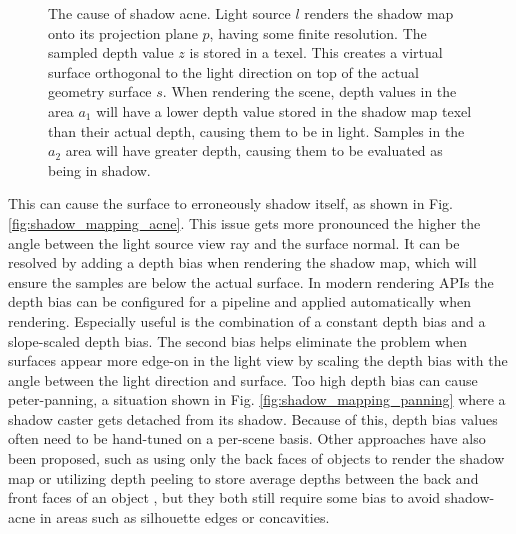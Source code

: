 \begin{figure}[hp]
    \caption{The cause of shadow acne. Light source \(l\) renders the shadow map onto its projection plane \(p\), having some finite resolution. The sampled depth value \(z\) is stored in a texel. This creates a virtual surface orthogonal to the light direction on top of the actual geometry surface \(s\). When rendering the scene, depth values in the area \(a_1\) will have a lower depth value stored in the shadow map texel than their actual depth, causing them to be in light. Samples in the \(a_2\) area will have greater depth, causing them to be evaluated as being in shadow.}
    \label{fig:shadow_mapping_acne_explanation}
\end{figure}
This can cause the surface to erroneously shadow itself, as shown in Fig. \ref{fig:shadow_mapping_acne}. This issue gets more pronounced the higher the angle between the light source view ray and the surface normal. It can be resolved by adding a depth bias when rendering the shadow map, which will ensure the samples are below the actual surface. In modern rendering APIs the depth bias can be configured for a pipeline and applied automatically when rendering. Especially useful is the combination of a constant depth bias and a slope-scaled depth bias. The second bias helps eliminate the problem when surfaces appear more edge-on in the light view by scaling the depth bias with the angle between the light direction and surface. Too high depth bias can cause peter-panning, a situation shown in Fig. \ref{fig:shadow_mapping_panning} where a shadow caster gets detached from its shadow. Because of this, depth bias values often need to be hand-tuned on a per-scene basis. Other approaches have also been proposed, such as using only the back faces of objects to render the shadow map \cite{bib:rep:wang_second_depth_mapping} or utilizing depth peeling to store average depths between the back and front faces of an object \cite{bib:book:woo_midpoint_depth_map}, but they both still require some bias to avoid shadow-acne in areas such as silhouette edges or concavities.

